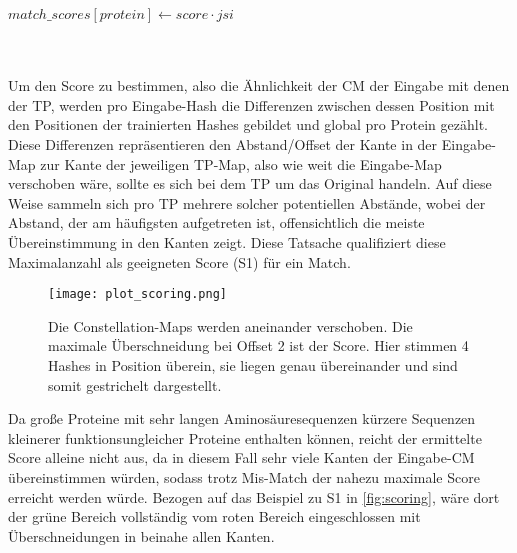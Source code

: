\begin{enumerate}[a)]
\begin{minipage}{\Width}
\begin{algorithm}[H]
\begin{algorithmic}[1]
                                \State $match\_scores[protein] \gets score \cdot jsi$
                            \EndFor
                        \end{algorithmic}
                    \end{algorithm}
                \end{minipage}\hfill\\\hfill\\

                Um den Score zu bestimmen, also die Ähnlichkeit der \ac{CM} der Eingabe mit denen der \ac{TP}, werden pro Eingabe-Hash die Differenzen zwischen dessen Position mit den Positionen der trainierten Hashes gebildet und global pro Protein gezählt. Diese Differenzen repräsentieren den Abstand/Offset der Kante in der Eingabe-Map zur Kante der jeweiligen \ac{TP}-Map, also wie weit die Eingabe-Map verschoben wäre, sollte es sich bei dem \ac{TP} um das Original handeln. Auf diese Weise sammeln sich pro \ac{TP} mehrere solcher potentiellen Abstände, wobei der Abstand, der am häufigsten aufgetreten ist, offensichtlich die meiste Übereinstimmung in den Kanten zeigt. Diese Tatsache qualifiziert diese Maximalanzahl als geeigneten Score (S1) für ein Match.

                \begin{minipage}{\Width}
                \begin{figure}[H]
                    \centering
                    \texttt{[image: plot\_scoring.png]}
                    \caption[Ermittlung des S1-Score]{Die Constellation-Maps werden aneinander verschoben. Die maximale Überschneidung bei Offset 2 ist der Score. Hier stimmen 4 Hashes in Position überein, sie liegen genau übereinander und sind somit gestrichelt dargestellt.}
                    \label{fig:scoring}
                \end{figure}
                \end{minipage}

                Da große Proteine mit sehr langen Aminosäuresequenzen kürzere Sequenzen kleinerer funktionsungleicher Proteine enthalten können, reicht der ermittelte Score alleine nicht aus, da in diesem Fall sehr viele Kanten der Eingabe-\ac{CM} übereinstimmen würden, sodass trotz Mis-Match der nahezu maximale Score erreicht werden würde. Bezogen auf das Beispiel zu S1 in \autoref{fig:scoring}, wäre dort der grüne Bereich vollständig vom roten Bereich eingeschlossen mit Überschneidungen in beinahe allen Kanten.


\end{enumerate}
